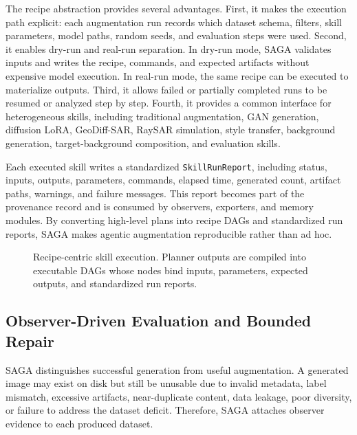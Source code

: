 The recipe abstraction provides several advantages.
First, it makes the execution path explicit: each augmentation run records which dataset schema, filters, skill parameters, model paths, random seeds, and evaluation steps were used.
Second, it enables dry-run and real-run separation.
In dry-run mode, SAGA validates inputs and writes the recipe, commands, and expected artifacts without expensive model execution.
In real-run mode, the same recipe can be executed to materialize outputs.
Third, it allows failed or partially completed runs to be resumed or analyzed step by step.
Fourth, it provides a common interface for heterogeneous skills, including traditional augmentation, GAN generation, diffusion LoRA, GeoDiff-SAR, RaySAR simulation, style transfer, background generation, target-background composition, and evaluation skills.

Each executed skill writes a standardized \texttt{SkillRunReport}, including status, inputs, outputs, parameters, commands, elapsed time, generated count, artifact paths, warnings, and failure messages.
This report becomes part of the provenance record and is consumed by observers, exporters, and memory modules.
By converting high-level plans into recipe DAGs and standardized run reports, SAGA makes agentic augmentation reproducible rather than ad hoc.

\begin{figure}[t]
    \centering
    \caption{Recipe-centric skill execution. Planner outputs are compiled into executable DAGs whose nodes bind inputs, parameters, expected outputs, and standardized run reports.}
    \label{fig:recipe_execution}
\end{figure}

\subsection{Observer-Driven Evaluation and Bounded Repair}
\label{subsec:observer_repair}

SAGA distinguishes successful generation from useful augmentation.
A generated image may exist on disk but still be unusable due to invalid metadata, label mismatch, excessive artifacts, near-duplicate content, data leakage, poor diversity, or failure to address the dataset deficit.
Therefore, SAGA attaches observer evidence to each produced dataset.

